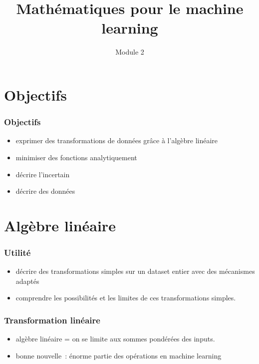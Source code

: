 \documentclass{formation}
\title{Mathématiques pour le machine learning}
\subtitle{Module 2}
\begin{document}
\maketitle

\section{Objectifs}

\begin{frame}
  \frametitle{Objectifs}

  \begin{itemize}
  \item exprimer des transformations de données grâce à
    l'algèbre linéaire
  \item minimiser des fonctions analytiquement
  \item décrire l'incertain
  \item décrire des données
  \end{itemize}
\end{frame}

\section{Algèbre linéaire}

\begin{frame}
  \frametitle{Utilité}

  \begin{itemize}
  \item décrire des transformations simples sur un dataset entier avec
    des mécanismes adaptés
  \item comprendre les possibilités et les limites de ces
    transformations simples.
  \end{itemize}
\end{frame}

\begin{frame}
  \frametitle{Transformation linéaire}

  \begin{itemize}
  \item algèbre linéaire = on se limite aux sommes pondérées des
    inputs.
  \item bonne nouvelle : énorme partie des opérations en machine
    learning
  \end{itemize}
\end{frame}
\end{document}
